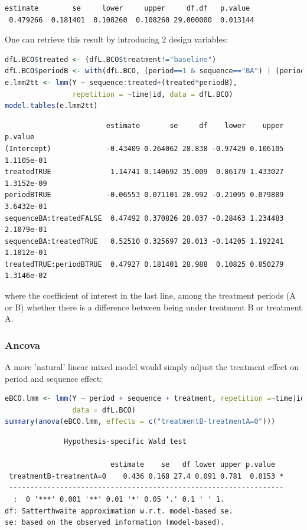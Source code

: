 \documentclass[12pt]{article}
\begin{document}
\label{}
\begin{verbatim}
estimate        se     lower     upper     df.df   p.value 
 0.479266  0.181401  0.108260  0.108260 29.000000  0.013144
\end{verbatim}


One can retrieve this result by introducing 2 design variables:
\begin{lstlisting}[language=r,numbers=none]
dfL.BCO$treated <- (dfL.BCO$treatment!="baseline")
dfL.BCO$periodB <- with(dfL.BCO, (period==1 & sequence=="BA") | (period==2 & sequence=="AB"))
e.lmm2tt <- lmm(Y ~ sequence:treated+(treated*periodB),
                repetition = ~time|id, data = dfL.BCO)
model.tables(e.lmm2tt)
\end{lstlisting}

\label{}
\begin{verbatim}
                        estimate       se     df    lower    upper    p.value
(Intercept)             -0.43409 0.264062 28.838 -0.97429 0.106105 1.1105e-01
treatedTRUE              1.14741 0.140692 35.009  0.86179 1.433027 1.3152e-09
periodBTRUE             -0.06553 0.071101 28.992 -0.21095 0.079889 3.6432e-01
sequenceBA:treatedFALSE  0.47492 0.370826 28.037 -0.28463 1.234483 2.1079e-01
sequenceBA:treatedTRUE   0.52510 0.325697 28.013 -0.14205 1.192241 1.1812e-01
treatedTRUE:periodBTRUE  0.47927 0.181401 28.988  0.10825 0.850279 1.3146e-02
\end{verbatim}


where the coefficient of interest in the last line, among the
treatment periods (A or B) whether there is a difference between being
under treatment B or treatment A.

\clearpage
\subsubsection{Ancova}
\label{sec:org85bd3cd}

A more 'natural' linear mixed model would simply adjust the treatment
effect on period and sequence effect:
\begin{lstlisting}[language=r,numbers=none]
eBCO.lmm <- lmm(Y ~ period + sequence + treatment, repetition =~time|id,
                data = dfL.BCO)
summary(anova(eBCO.lmm, effects = c("treatmentB-treatmentA=0")))
\end{lstlisting}

\label{}
\begin{verbatim}
              Hypothesis-specific Wald test 

                         estimate    se   df lower upper p.value  
 treatmentB-treatmentA=0    0.436 0.168 27.4 0.091 0.781  0.0153 *
 ----------------------------------------------------------------- 
  :  0 '***' 0.001 '**' 0.01 '*' 0.05 '.' 0.1 ' ' 1.
df: Satterthwaite approximation w.r.t. model-based se. 
se: based on the observed information (model-based).
\end{verbatim}
\end{document}

